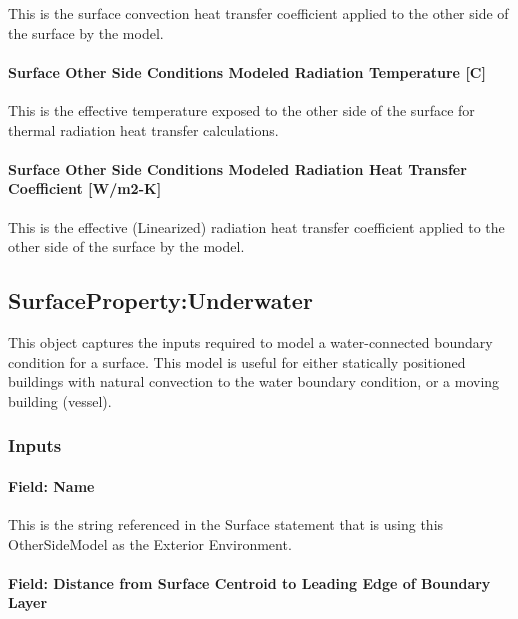 This is the surface convection heat transfer coefficient applied to the other side of the surface by the model.

\paragraph{Surface Other Side Conditions Modeled Radiation Temperature {[}C{]}}\label{surface-other-side-conditions-modeled-radiation-temperature-c}

This is the effective temperature exposed to the other side of the surface for thermal radiation heat transfer calculations.

\paragraph{Surface Other Side Conditions Modeled Radiation Heat Transfer Coefficient {[}W/m2-K{]}}\label{surface-other-side-conditions-modeled-radiation-heat-transfer-coefficient-wm2-k}

This is the effective (Linearized) radiation heat transfer coefficient applied to the other side of the surface by the model.

\subsection{SurfaceProperty:Underwater}\label{surfacepropertyunderwater}

This object captures the inputs required to model a water-connected boundary condition for a surface.
This model is useful for either statically positioned buildings with natural convection to the water boundary condition, or a moving building (vessel).

\subsubsection{Inputs}\label{surfacepropertyunderwater-inputs}

\paragraph{Field: Name}\label{surfacepropertyunderwater-inputs-name}

This is the string referenced in the Surface statement that is using this OtherSideModel as the Exterior Environment.

\paragraph{Field: Distance from Surface Centroid to Leading Edge of Boundary Layer}\label{surfacepropertyunderwater-inputs-boundarylayerdistance}

